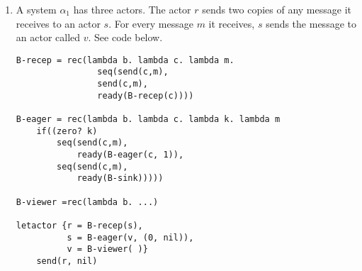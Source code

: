 \documentclass{article}
\begin{document}
\begin{enumerate}
\begin{enumerate}
\item A system $\alpha_1$ has three actors. The actor $r$ sends two copies of
any message it receives to an actor $s$. For every message $m$ it receives,
$s$ sends the message to an actor called $v$. See code below.
\begin{verbatim}
B-recep = rec(lambda b. lambda c. lambda m.
                seq(send(c,m),
                send(c,m),
                ready(B-recep(c))))

B-eager = rec(lambda b. lambda c. lambda k. lambda m
    if((zero? k)
        seq(send(c,m),
            ready(B-eager(c, 1)),
        seq(send(c,m),
            ready(B-sink)))))

B-viewer =rec(lambda b. ...)

letactor {r = B-recep(s),
          s = B-eager(v, (0, nil)),
          v = B-viewer( )}
    send(r, nil)
\end{verbatim}

\end{enumerate}

\end{enumerate}
\end{document}
